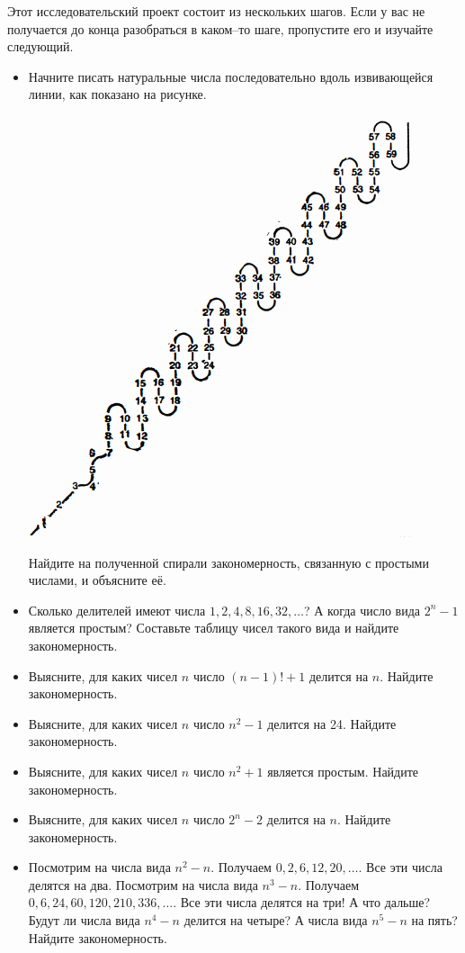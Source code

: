 \documentclass[10pt]{scrbook} \usepackage{modules/nonstahp_book}
\begin{document}
Этот исследовательский проект состоит из нескольких шагов. Если у вас не получается до конца разобраться в каком--то шаге, пропустите его и изучайте следующий. 
\begin{itemize}
\item Начните писать натуральные числа последовательно вдоль извивающейся линии, как показано на рисунке.
\begin{center}
\includegraphics[width=0.85\linewidth]{primes.png}
\end{center}
Найдите на полученной спирали закономерность, связанную с простыми числами, и объясните её.
\item Сколько делителей имеют числа $1, 2, 4, 8, 16, 32, \ldots$? А когда число вида $2^n - 1$ является простым? Составьте таблицу чисел такого вида и найдите закономерность.
\item Выясните, для каких чисел $n$ число $(n-1)!+1$ делится на $n$. Найдите закономерность.
\item Выясните, для каких чисел $n$ число $n^2-1$ делится на 24. Найдите закономерность. 
\item Выясните, для каких чисел $n$ число $n^2+1$ является простым. Найдите закономерность. 
\item Выясните, для каких чисел $n$ число $2^n-2$ делится на $n$. Найдите закономерность. %
\item Посмотрим на числа вида $n^2-n$. Получаем $0,2,6,12,20,\ldots$. Все эти числа делятся на два. Посмотрим на числа вида $n^3-n$. Получаем $0, 6, 24, 60, 120, 210, 336, \ldots$. Все эти числа делятся на три! А что дальше? Будут ли числа вида $n^4-n$ делится на четыре? А числа вида $n^5-n$ на пять? Найдите закономерность.
\end{itemize}
\end{document}
